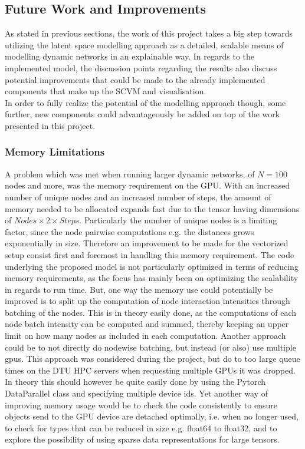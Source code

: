 \subsection{Future Work and Improvements}
\label{sec:Discussion:FutureWork}
As stated in previous sections, the work of this project takes a big step towards utilizing the latent space modelling approach as a detailed, scalable means of modelling dynamic networks in an explainable way.
In regards to the implemented model, the discussion points regarding the results also discuss potential improvements that could be made to the already implemented components that make up the SCVM and visualisation. 
\\
In order to fully realize the potential of the modelling approach though, some further, new components could advantageously be added on top of the work presented in this project.


\subsubsection{Memory Limitations}
\label{sec:Discussion:FutureWork:MemoryLimitations}
A problem which was met when running larger dynamic networks, of $N = 100$ nodes and more, was the memory requirement on the GPU.
With an increased number of unique nodes and an increased number of steps, the amount of memory needed to be allocated expands fast due to the tensor having dimensions of $Nodes \times 2 \times Steps$. Particularly the number of unique nodes is a limiting factor, since the node pairwise computations e.g. the distances grows exponentially in size.
Therefore an improvement to be made for the vectorized setup consist first and foremost in handling this memory requirement. The code underlying the proposed model is not particularly optimized in terms of reducing memory requirements, as the focus has mainly been on optimizing the scalability in regards to run time. But, one way the memory use could potentially be improved is to split up the computation of node interaction intensities through batching of the nodes. This is in theory easily done, as the computations of each node batch intensity can be computed and summed, thereby keeping an upper limit on how many nodes as included in each computation. Another approach could be to not directly do nodewise batching, but instead (or also) use multiple gpus. This approach was considered during the project, but do to too large queue times on the DTU HPC servers when requesting multiple GPUs it was dropped. In theory this should however be quite easily done by using the Pytorch DataParallel\cite{DataParallelDocumentation} class and specifying multiple device ids. Yet another way of improving memory usage would be to check the code consistently to ensure objects send to the GPU device are detached optimally, i.e. when no longer used, to check for types that can be reduced in size e.g. float64 to float32, and to explore the possibility of using sparse data representations\cite{Torch.sparseDocumentation} for large tensors.


